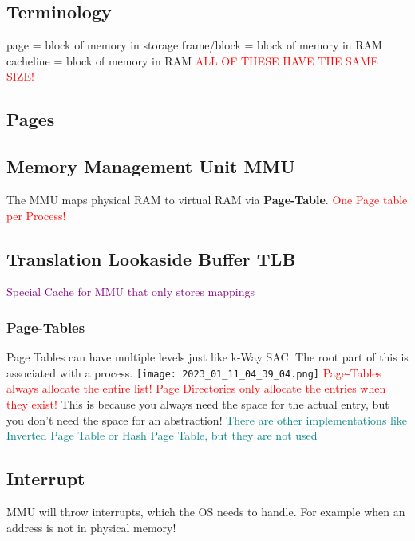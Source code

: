 \documentclass[main.tex,fontsize=8pt,paper=a4,paper=landscape,DIV=calc,]{scrartcl}
\begin{document}
\begin{multicols*}{4}
\subsection{Terminology}
page = block of memory in storage
frame/block = block of memory in RAM
cacheline = block of memory in RAM
\textcolor{red}{ALL OF THESE HAVE THE SAME SIZE!}

\subsection{Pages}

\subsection{Memory Management Unit MMU}
The MMU maps physical RAM to virtual RAM via \textbf{Page-Table}.\newline
\textcolor{red}{One Page table per Process!}

\subsection{Translation Lookaside Buffer TLB}
\textcolor{purple}{Special Cache for MMU that only stores mappings}

\subsubsection{Page-Tables}
Page Tables can have multiple levels just like k-Way SAC.\newline
The root part of this is associated with a process.\newline
\texttt{[image: 2023\_01\_11\_04\_39\_04.png]}\newline
\textcolor{red}{Page-Tables always allocate the entire list! Page Directories only allocate the entries when they exist!}\newline
This is because you always need the space for the actual entry, but you don't need the space for an abstraction!
\textcolor{teal}{There are other implementations like Inverted Page Table or Hash Page Table, but they are not used}

\subsection{Interrupt}
MMU will throw interrupts, which the OS needs to handle.\newline
For example when an address is not in physical memory!\newline


\end{multicols*}
\end{document}
